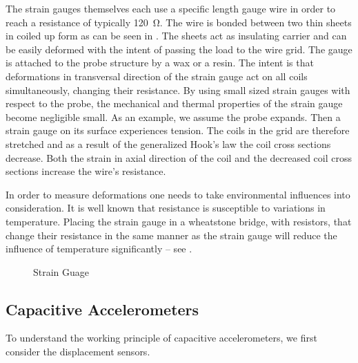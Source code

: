 The strain gauges themselves each use a specific length gauge wire in order to reach a resistance of typically \SI{120}{\ohm}. The wire is bonded between two thin sheets in coiled up form as can be seen in . The sheets act as insulating carrier and can be easily deformed with the intent of passing the load to the wire grid. The gauge is attached to the probe structure by a wax or a resin. The intent is that deformations in transversal direction of the strain gauge act on all coils simultaneously, changing their resistance. By using small sized strain gauges with respect to the probe, the mechanical and thermal properties of the strain gauge become negligible small. As an example, we assume the probe expands. Then a strain gauge on its surface experiences tension. The coils in the grid are therefore stretched and as a result of the generalized Hook's law the coil cross sections decrease. Both the strain in axial direction of the coil and the decreased coil cross sections increase the wire's resistance.

In order to measure deformations one needs to take environmental influences into consideration. It is well known that resistance is susceptible to variations in temperature. Placing the strain gauge in a wheatstone bridge, with resistors, that change their resistance in the same manner as the strain gauge will reduce the influence of temperature significantly -- see .

\begin{figure}[!htb]
    \centering
    \hspace{4em}
    \caption[Strain Gauge]{Strain Guage}
\end{figure}

\subsection{Capacitive Accelerometers}

To understand the working principle of capacitive accelerometers, we first consider the displacement sensors.

